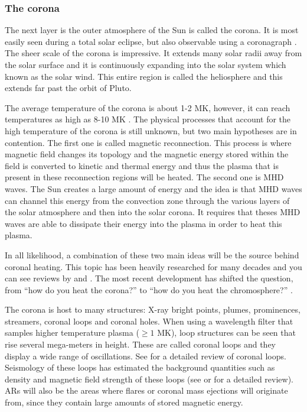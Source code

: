 \subsubsection{The corona}
\label{corona}

    The next layer is the outer atmosphere of the Sun is called the corona.
    It is most easily seen during a total solar eclipse, but also observable using a coronagraph \citep{markus2004physics}.
    The sheer scale of the corona is impressive.
    It extends many solar radii away from the solar surface and it is continuously expanding into the solar system which known as the solar wind.
    This entire region is called the heliosphere and this extends far past the orbit of Pluto.
    
    The average temperature of the corona is about 1-2 MK, however, it can reach temperatures as high as 8-10 MK \citep{markus2004physics}.
	The physical processes that account for the high temperature of the corona is still unknown, but two main hypotheses are in contention.
    The first one is called magnetic reconnection. 
    This process is where magnetic field changes its topology and the magnetic energy stored within the field is converted to kinetic and thermal energy and thus the plasma that is present in these reconnection regions will be heated. 
    The second one is MHD waves.
    The Sun creates a large amount of energy and the idea is that MHD waves can channel this energy from the convection zone through the various layers of the solar atmosphere and then into the solar corona.
	It requires that theses MHD waves are able to dissipate their energy into the plasma in order to heat this plasma.
    
    In all likelihood, a combination of these two main ideas will be the source behind coronal heating.
    This topic has been heavily researched for many decades and you can see reviews by \cite{erdelyi2004heating} and \cite{Parnell2012}.
    The most recent development has shifted the question, from ``how do you heat the corona?'' to ``how do you heat the chromosphere?'' \citep{Aschwanden2007}.
    
    The corona is host to many structures: X-ray bright points, plumes, prominences, streamers, coronal loops and coronal holes.
    When using a wavelength filter that samples higher temperature plasma ($\ge1$ MK), loop structures can be seen that rise several mega-meters in height.
    These are called coronal loops and they display a wide range of oscillations.
    See \cite{2010LRSP....7....5R} for a detailed review of coronal loops.
    Seismology of these loops has estimated the background quantities such as density and magnetic field strength of these loops (see \cite{2005RSPTA.363.2743D} or \cite{Banerjee2007} for a detailed review). 
    ARs  will also be the areas where flares or coronal mass ejections will originate from, since they contain large amounts of stored magnetic energy.
    
